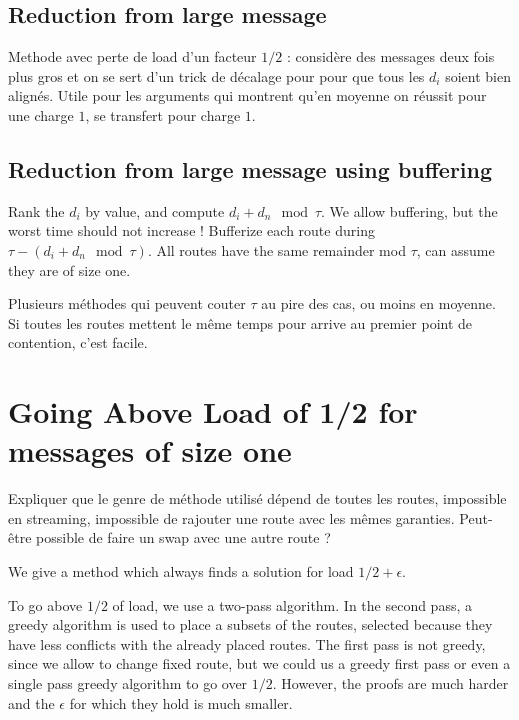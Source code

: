\documentclass[10pt, conference, letterpaper]{IEEEtran}
\begin{document}
\subsection{Reduction from large message}

Methode avec perte de load d'un facteur $1/2$ : considère 
des messages deux fois plus gros et on se sert d'un trick de décalage pour 
pour que tous les $d_i$ soient bien alignés.  
Utile pour les arguments qui montrent qu'en moyenne on
réussit pour une charge $1$, se transfert pour charge $1$.


\subsection{Reduction from large message using buffering}
Rank the $d_i$ by value, and compute $d_i + d_n \mod \tau$.
We allow buffering, but the worst time should not increase !
Bufferize  each route during $\tau - (d_i + d_n \mod \tau)$.
All routes have the same remainder mod $\tau$, can assume they are of 
size one.

Plusieurs méthodes qui peuvent couter $\tau$ au pire des cas, ou moins en moyenne.
Si toutes les routes mettent le même temps pour arrive au premier
point de contention, c'est facile.

\section{Going Above Load of 1/2 for messages of size one}


Expliquer que le genre de méthode utilisé dépend de toutes les routes,
impossible en streaming, impossible de rajouter une route avec les mêmes garanties.
Peut-être possible de faire un swap avec une autre route ?


We  give a method which always finds a solution for load $1/2 + \epsilon$.


To go above $1/2$ of load, we use a two-pass algorithm. In the second pass, a greedy algorithm is used 
to place a subsets of the routes, selected because they have less conflicts with the already placed 
routes. The first pass is not greedy, since we allow to change fixed route, but we could us a greedy first
pass or even a single pass greedy algorithm to go over $1/2$. However, the proofs are much harder and 
the $\epsilon$ for which they hold is much smaller.
\end{document}
